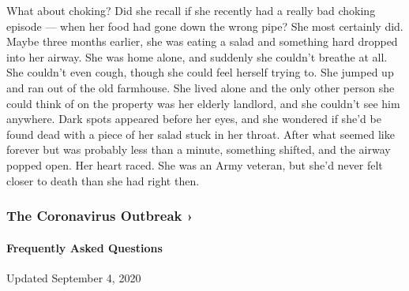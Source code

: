 What about choking? Did she recall if she recently had a really bad
choking episode --- when her food had gone down the wrong pipe? She most
certainly did. Maybe three months earlier, she was eating a salad and
something hard dropped into her airway. She was home alone, and suddenly
she couldn't breathe at all. She couldn't even cough, though she could
feel herself trying to. She jumped up and ran out of the old farmhouse.
She lived alone and the only other person she could think of on the
property was her elderly landlord, and she couldn't see him anywhere.
Dark spots appeared before her eyes, and she wondered if she'd be found
dead with a piece of her salad stuck in her throat. After what seemed
like forever but was probably less than a minute, something shifted, and
the airway popped open. Her heart raced. She was an Army veteran, but
she'd never felt closer to death than she had right then.

\href{https://www.nytimes3xbfgragh.onion/news-event/coronavirus?action=click\&pgtype=Article\&state=default\&region=MAIN_CONTENT_3\&context=storylines_faq}{}

\hypertarget{the-coronavirus-outbreak-}{%
\subsubsection{The Coronavirus Outbreak
›}\label{the-coronavirus-outbreak-}}

\hypertarget{frequently-asked-questions}{%
\paragraph{Frequently Asked
Questions}\label{frequently-asked-questions}}

Updated September 4, 2020

